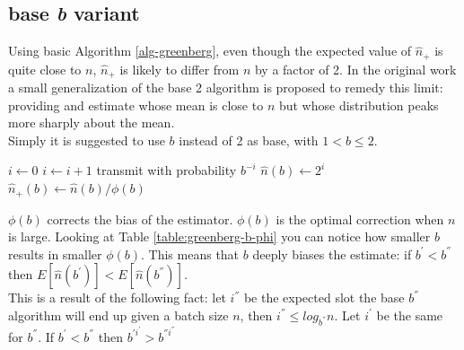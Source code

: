 \documentclass[12pt,a4paper]{report}
\newcommand{\algname}[1]{\ensuremath{\mbox{\sc #1}}}
\begin{document}
\subsection{base \emph{b} variant}

Using basic Algorithm \ref{alg-greenberg}, even though the expected value of $\hat{n}_{+}$ is quite close to $n$, $\hat{n}_{+}$ is likely to differ from $n$ by a factor of 2. In the original work a small generalization of the base 2 algorithm is proposed to remedy this limit: providing and estimate whose mean is  close to $n$ but whose  distribution peaks more sharply about the mean.\\
Simply it is suggested to use $b$ instead of 2 as base, with $1<b\leq2$.\\
\begin{algorithm}[H]
\begin{algorithmic}
\STATE $i\gets 0$
\REPEAT
	\STATE $i\gets i+1$
	\STATE transmit with probability $b^{-i}$
\STATE $\hat{n}(b) \gets 2^{i}$
\STATE $\hat{n}_{+}(b) \gets \hat{n}(b)/\phi(b)$
\end{algorithmic}
\caption{\algname{base \emph{b} Greenberg}}
\label{alg-greenberg-base-b}
\end{algorithm}

$\phi(b)$ corrects the bias of the estimator. $\phi(b)$ is the optimal correction when $n$ is large.
Looking at Table \ref{table:greenberg-b-phi} you can notice how smaller $b$ results in smaller $\phi(b)$. This means that $b$ deeply biases the estimate: if $b^{'} < b^{''}$ then $E[\hat{n}(b^{'})] < E[\hat{n}(b^{''})]$.\\ This is a result of the following fact: let $i^{''}$ be the expected slot the base $b^{''}$ algorithm will end up given a batch size $n$, then $i^{''} \leq log_{b^{''}} n$. Let $i^{'}$ be the same for $b^{''}$. If $b^{'} < b^{''}$ then $b^{'i^{'}} > b^{''i^{''}}$ 

\end{document}
